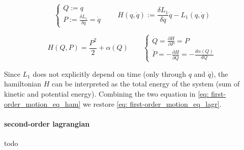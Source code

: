 \begin{equation*}
  \begin{cases}
    Q := q \\
    P := \frac{\delta L_1}{\delta \dot{q}} = \dot{q}
  \end{cases}
  \qquad
  H(q, \dot{q}) := \frac{\delta L_1}{\delta \dot{q}} \dot{q} - L_1(q, \dot{q})
\end{equation*}

\begin{equation} \label{eq: first-order_motion_eq_ham}
  H(Q, P) = \frac{P^2}{2} + \alpha(Q) \qquad
  \begin{cases}
    \dot{Q} =   \frac{\partial H}{\partial P} = P \\
    \dot{P} = - \frac{\partial H}{\partial Q} = - \frac{d\alpha(Q)}{dQ}
  \end{cases}
\end{equation}

Since $L_1$ does not explicitly depend on time (only through $q$ and $\dot{q}$),
the hamiltonian $H$ can be interpreted as the total energy of the system (sum of
kinetic and potential energy).  Combining the two equation in \eqref{eq:
first-order_motion_eq_ham} we restore \eqref{eq: first-order_motion_eq_lagr}.


\paragraph{second-order lagrangian} todo
